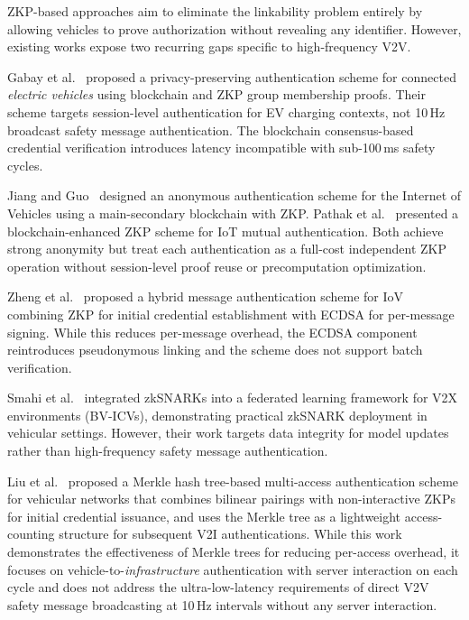 ZKP-based approaches aim to eliminate the linkability problem entirely by allowing
vehicles to prove authorization without revealing any identifier. However, existing
works expose two recurring gaps specific to high-frequency V2V.

Gabay et al.~\cite{gabay2020} proposed a privacy-preserving authentication scheme
for connected \emph{electric vehicles} using blockchain and ZKP group membership
proofs. Their scheme targets session-level authentication for EV charging contexts,
not 10\,Hz broadcast safety message authentication. The blockchain
consensus-based credential verification introduces latency incompatible with
sub-100\,ms safety cycles.

Jiang and Guo~\cite{jiang2024} designed an anonymous authentication scheme for the
Internet of Vehicles using a main-secondary blockchain with ZKP. Pathak et
al.~\cite{pathak2024} presented a blockchain-enhanced ZKP scheme for IoT mutual
authentication. Both achieve strong anonymity but treat each authentication as a
full-cost independent ZKP operation without session-level proof reuse or
precomputation optimization.

Zheng et al.~\cite{zheng2024hybrid} proposed a hybrid message authentication
scheme for IoV combining ZKP for initial credential establishment with ECDSA for
per-message signing. While this reduces per-message overhead, the ECDSA component
reintroduces pseudonymous linking and the scheme does not support batch verification.

Smahi et al.~\cite{smahi2023bvicvs} integrated zkSNARKs into a federated learning
framework for V2X environments (BV-ICVs), demonstrating practical zkSNARK deployment
in vehicular settings. However, their work targets data integrity for model updates
rather than high-frequency safety message authentication.

Liu et al.~\cite{liu2025} proposed a Merkle hash tree-based multi-access
authentication scheme for vehicular networks that combines bilinear pairings with
non-interactive ZKPs for initial credential issuance, and uses the Merkle tree as a
lightweight access-counting structure for subsequent V2I authentications. While
this work demonstrates the effectiveness of Merkle trees for reducing per-access
overhead, it focuses on vehicle-to-\emph{infrastructure} authentication with server
interaction on each cycle and does not address the ultra-low-latency requirements
of direct V2V safety message broadcasting at 10\,Hz intervals without any server
interaction.

